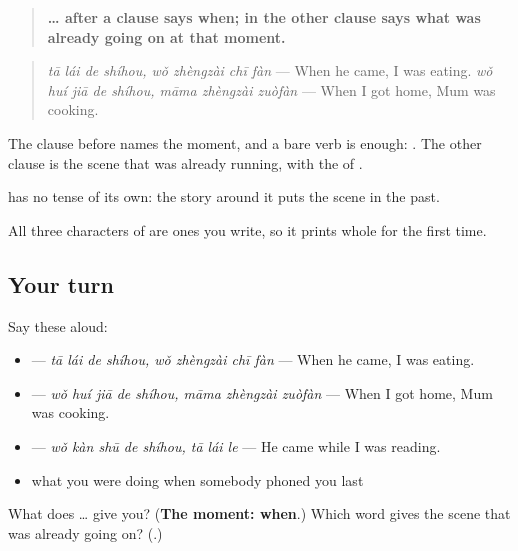\begin{grammarlens}[title={Grammar Lens: …\zh{的时候} and \zh{正在}, for what was going on}]
\begin{quote}
\textbf{… after a clause says when;  in the other clause says what was already going on at that moment.}
\end{quote}

\begin{quote}
\textbf{ } \emph{tā lái de shíhou, wǒ zhèngzài chī fàn} — When he came, I was eating. \textbf{ } \emph{wǒ huí jiā de shíhou, māma zhèngzài zuòfàn} — When I got home, Mum was cooking.
\end{quote}

The clause before  names the moment, and a bare verb is enough: . The other clause is the scene that was already running, with the  of .

 has no tense of its own: the story around it puts the scene in the past.

All three characters of  are ones you write, so it prints whole for the first time.
\end{grammarlens}

\subsection*{Your turn}
Say these aloud:

\begin{itemize}
\raggedright
  \item {}  — \emph{tā lái de shíhou, wǒ zhèngzài chī fàn} — When he came, I was eating.
  \item {}  — \emph{wǒ huí jiā de shíhou, māma zhèngzài zuòfàn} — When I got home, Mum was cooking.
  \item {}  — \emph{wǒ kàn shū de shíhou, tā lái le} — He came while I was reading.
  \item what you were doing when somebody phoned you last
\end{itemize}

\begin{tcolorbox}[breakable,colback=teal!4,colframe=teal!35!black,title={Before you move on}]
What does … give you? (\textbf{The moment: when}.) Which word gives the scene that was already going on? (\textbf{}.)
\end{tcolorbox}

